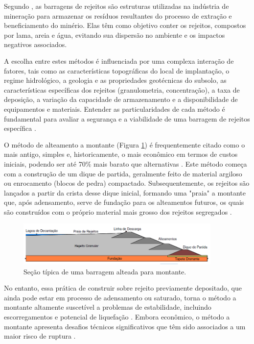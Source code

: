 Segundo , as barragens de rejeitos são estruturas utilizadas na indústria de mineração para armazenar os resíduos resultantes do processo de extração e beneficiamento do minério. Elas têm como objetivo conter os rejeitos, compostos por lama, areia e água, evitando sua dispersão no ambiente e os impactos negativos associados.

A escolha entre estes métodos é influenciada por uma complexa interação de fatores, tais como as características topográficas do local de implantação, o regime hidrológico, a geologia e as propriedades geotécnicas do subsolo, as características específicas dos rejeitos (granulometria, concentração), a taxa de deposição, a variação da capacidade de armazenamento e a disponibilidade de equipamentos e materiais. Entender as particularidades de cada método é fundamental para avaliar a segurança e a viabilidade de uma barragem de rejeitos específica \cite{soares2010, warzynski2023}.


O método de alteamento a montante (Figura \ref{fig:metodo_montante}) é frequentemente citado como o mais antigo, simples e, historicamente, o mais econômico em termos de custos iniciais, podendo ser até 70\% mais barato que alternativas \cite{ibram2016, thome2018}. Este método começa com a construção de um dique de partida, geralmente feito de material argiloso ou enrocamento (blocos de pedra) compactado. Subsequentemente, os rejeitos são lançados a partir da crista desse dique inicial, formando uma "praia" a montante que, após adensamento, serve de fundação para os alteamentos futuros, os quais são construídos com o próprio material mais grosso dos rejeitos segregados \cite{ibram2016, carvalho2018}. 

\begin{figure}[!htb]
    \centering
    \includegraphics[width=0.9\textwidth]{figures/image18_metodo_montante.png}
    \caption{Seção típica de uma barragem alteada para montante.}
    \label{fig:metodo_montante}
\end{figure}

No entanto, essa prática de construir sobre rejeito previamente depositado, que ainda pode estar em processo de adensamento ou saturado, torna o método a montante altamente suscetível a problemas de estabilidade, incluindo escorregamentos e potencial de liquefação \cite{araujo2006}. Embora econômico, o método a montante apresenta desafios técnicos significativos que têm sido associados a um maior risco de ruptura \cite{thome2018}.

